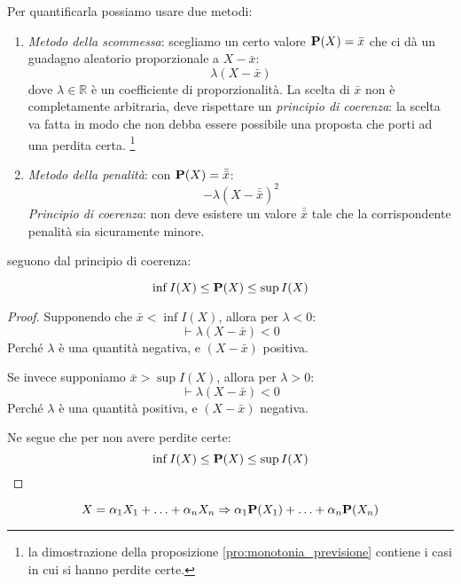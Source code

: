 Per quantificarla possiamo usare due metodi:
\begin{enumerate}
\item \emph{Metodo della scommessa}: scegliamo un certo valore \( \mathbf{P}(X) = \bar{x} \) che ci dà un guadagno aleatorio proporzionale a \( X -\bar{x} \):
  \[ \lambda(X-\bar{x}) \]
  dove \( \lambda \in \mathbb{R} \) è un coefficiente di proporzionalità.
  La scelta di $\bar{x}$ non è completamente arbitraria, deve rispettare un \emph{principio di coerenza}:
  la scelta va fatta in modo che non debba essere possibile una proposta che porti ad una perdita certa.
  \footnote{la dimostrazione della proposizione \ref{pro:monotonia_previsione} contiene i casi in cui si hanno perdite certe.}

\item \emph{Metodo della penalità}: con \( \mathbf{P}(X) = \bar{\bar{x}} \):
  \[ - \lambda(X - \bar{\bar{x}})^2 \]
  \emph{Principio di coerenza}: non deve esistere un valore $\bar{\bar{x}}$ tale che la corrispondente penalità sia sicuramente minore.
\end{enumerate}

 seguono dal principio di coerenza:

\begin{proposition}\label{pro:monotonia_previsione}
  \[ \inf I(X) \leq \mathbf{P}(X) \leq \sup I(X) \]
\end{proposition}

\begin{proof}
  Supponendo che \( \bar{x} < \inf I(X) \), allora per \( \lambda < 0 \):
  \[ \vdash \lambda(X - \bar{x}) < 0 \]
  Perché $\lambda$ è una quantità negativa, e \( (X - \bar{x}) \) positiva.

  Se invece supponiamo \( \bar{x} > \sup I(X) \), allora per \( \lambda > 0 \):
  \[ \vdash \lambda(X - \bar{x}) < 0 \]
  Perché $\lambda$ è una quantità positiva, e \( (X - \bar{x}) \) negativa.

  Ne segue che per non avere perdite certe:
  \[ \inf I(X) \leq \mathbf{P}(X) \leq \sup I(X) \]
\end{proof}

\begin{proposition}\label{pro:linearita_previsione}
  \[ X = \alpha_1 X_1 + \ldots + \alpha_n X_n \Rightarrow \alpha_1 \mathbf{P}(X_1) + \ldots + \alpha_n \mathbf{P}(X_n) \]
\end{proposition}

